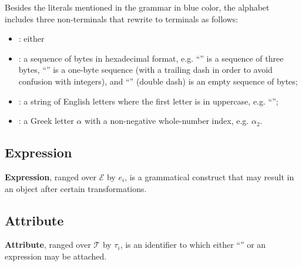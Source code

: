 Besides the literals mentioned in the grammar in blue color, the
alphabet includes three non-terminals that rewrite to terminals as follows:
\begin{itemize}
  \item {}: either 
  \item {}: a sequence of bytes in hexadecimal format, e.g. ``'' is a sequence of three bytes, ``'' is a one-byte sequence (with a trailing dash in order to avoid confusion with integers), and ``\ff{-{}-}'' (double dash) is an empty sequence of bytes;
  \item {}: a string of English letters where the first letter is in uppercase, e.g. ``'';
  \item {}: a Greek letter \(\alpha\) with a non-negative whole-number index, e.g. \(\alpha_2\).
\end{itemize}

\subsection{Expression}\label{sec:expression}

\begin{definition}[Expression]
\textbf{Expression}, ranged over \(\mathcal{E}\) by \(e_i\),
is a grammatical construct that may result in an object after
certain transformations.
\end{definition}

\subsection{Attribute}\label{sec:attribute}

\begin{definition}[Attribute]
\textbf{Attribute}, ranged over \(\mathcal{T}\) by \(\tau_i\),
  is an identifier to which either ``\stx{\varnothing}'' or an expression
  may be attached.
\end{definition}

